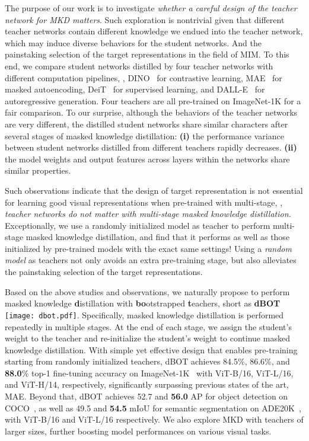 \documentclass[10pt,twocolumn,letterpaper]{article}
\def\ourmethod{{dBOT}\xspace}
\begin{document}
The purpose of our work is to investigate \textit{whether a careful design of the teacher network for MKD matters}.
Such exploration is nontrivial given that different teacher networks contain different knowledge we endued into the teacher network,
which may induce diverse behaviors for the student networks.
And the painstaking selection of the target representations in the field of MIM.
To this end, we compare student networks distilled by four teacher networks with different computation pipelines, \ie, DINO~\cite{dino} for contrastive learning, MAE~\cite{mae} for masked autoencoding, DeiT~\cite{deit} for supervised learning, and DALL-E~\cite{dall-e} for autoregressive generation.
Four teachers are all pre-trained on ImageNet-1K for a fair comparison.
To our surprise, although the behaviors of the teacher networks are very different, the distilled student networks share similar characters after several stages of masked knowledge distillation:
\textbf{(i)} the performance variance between student networks distilled from different teachers rapidly decreases.
\textbf{(ii)} the model weights and output features across layers within the networks share similar properties.

Such observations indicate that the design of target representation is not essential for learning good visual representations when pre-trained with multi-stage, \ie, \textit{teacher networks do not matter with multi-stage masked knowledge distillation.}
Exceptionally, we use a randomly initialized model as teacher to perform multi-stage masked knowledge distillation, and find that it performs as well as those initialized by pre-trained models with the exact same settings!
Using a \textit{random model} as teachers not only avoids an extra pre-training stage, but also alleviates the painstaking selection of the target representations.

Based on the above studies and observations, we naturally propose to perform masked knowledge \textbf{d}istillation with \textbf{bo}otstrapped \textbf{t}eachers, short as \textbf{\ourmethod} \texttt{[image: dbot.pdf]}. 
Specifically, masked knowledge distillation is performed repeatedly in multiple stages. At the end of each stage, we assign the student's weight to the teacher and re-initialize the student's weight to continue masked knowledge distillation.
With simple yet effective design that enables pre-training starting from randomly initialized teachers, \ourmethod achieves 84.5\%, 86.6\%, and \textbf{88.0}\% top-1 fine-tuning accuracy on ImageNet-1K~\cite{imagenet} with ViT-B/16, ViT-L/16, and ViT-H/14, respectively, significantly surpassing previous states of the art, MAE.
Beyond that, \ourmethod achieves 52.7 and \textbf{56.0} AP for object detection on COCO~\cite{coco}, as well as 49.5 and \textbf{54.5} mIoU for semantic segmentation on ADE20K~\cite{ade}, with ViT-B/16 and ViT-L/16 respectively.
We also explore MKD with teachers of larger sizes, further boosting model performances on various visual tasks.
\end{document}
